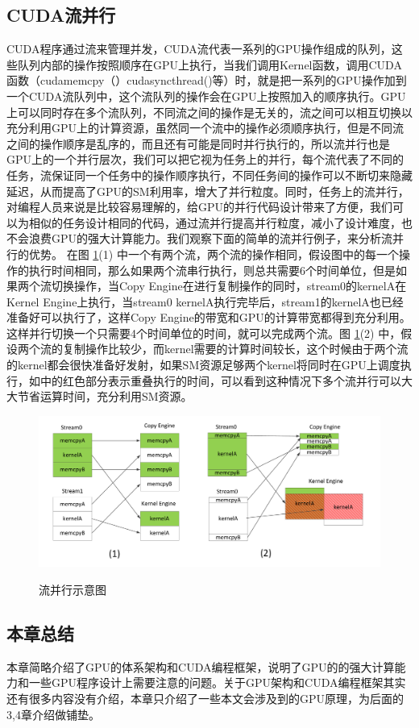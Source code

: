 \subsection{CUDA流并行}
CUDA程序通过流来管理并发，CUDA流代表一系列的GPU操作组成的队列，这些队列内部的操作按照顺序在GPU上执行，当我们调用Kernel函数，调用CUDA函数（cudamemcpy（）cudasyncthread()等）时，就是把一系列的GPU操作加到一个CUDA流队列中，这个流队列的操作会在GPU上按照加入的顺序执行。GPU上可以同时存在多个流队列，不同流之间的操作是无关的，流之间可以相互切换以充分利用GPU上的计算资源，虽然同一个流中的操作必须顺序执行，但是不同流之间的操作顺序是乱序的，而且还有可能是同时并行执行的，所以流并行也是GPU上的一个并行层次，我们可以把它视为任务上的并行，每个流代表了不同的任务，流保证同一个任务中的操作顺序执行，不同任务间的操作可以不断切来隐藏延迟，从而提高了GPU的SM利用率，增大了并行粒度。同时，任务上的流并行，对编程人员来说是比较容易理解的，给GPU的并行代码设计带来了方便，我们可以为相似的任务设计相同的代码，通过流并行提高并行粒度，减小了设计难度，也不会浪费GPU的强大计算能力。我们观察下面的简单的流并行例子，来分析流并行的优势。
在图 \ref{flow}(1) 中一个有两个流，两个流的操作相同，假设图中的每一个操作的执行时间相同，那么如果两个流串行执行，则总共需要6个时间单位，但是如果两个流切换操作，当Copy Engine在进行复制操作的同时，stream0的kernelA在Kernel Engine上执行，当stream0 kernelA执行完毕后，stream1的kernelA也已经准备好可以执行了，这样Copy Engine的带宽和GPU的计算带宽都得到充分利用。这样并行切换一个只需要4个时间单位的时间，就可以完成两个流。图 \ref{flow}(2) 中，假设两个流的复制操作比较少，而kernel需要的计算时间较长，这个时候由于两个流的kernel都会很快准备好发射，如果SM资源足够两个kernel将同时在GPU上调度执行，如中的红色部分表示重叠执行的时间，可以看到这种情况下多个流并行可以大大节省运算时间，充分利用SM资源。
\begin{figure}
\setlength{\belowcaptionskip}{-0.5cm}
  \begin{center}
    {\includegraphics[width=1 \textwidth]{figures/flow.pdf}}
    \end{center}
  \caption{{\footnotesize{流并行示意图}}}
  \label{flow}
\end{figure}
\subsection{本章总结}
本章简略介绍了GPU的体系架构和CUDA编程框架，说明了GPU的的强大计算能力和一些GPU程序设计上需要注意的问题。关于GPU架构和CUDA编程框架其实还有很多内容没有介绍，本章只介绍了一些本文会涉及到的GPU原理，为后面的3,4章介绍做铺垫。